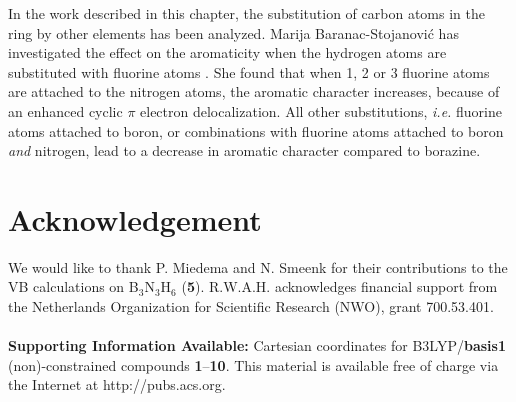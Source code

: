 In the work described in this chapter, the substitution of carbon atoms in the ring by other elements has been analyzed. Marija Baranac-Stojanovi\'c has investigated the effect on the aromaticity when the hydrogen atoms are substituted with fluorine atoms \cite{ac09}. She found that when 1, 2 or 3 fluorine atoms are attached to the nitrogen atoms, the aromatic character increases, because of an enhanced cyclic $\pi$ electron delocalization. All other substitutions, \textit{i.e.} fluorine atoms attached to boron, or combinations with fluorine atoms attached to boron \textit{and} nitrogen, lead to a decrease in aromatic character compared to borazine.

\section*{Acknowledgement}

We would like to thank P. Miedema and N. Smeenk for their contributions to the VB calculations on B$_3$N$_3$H$_6$ (\textbf{5}).
R.W.A.H. acknowledges financial support from the Netherlands Organization for Scientific Research (NWO), grant 700.53.401.
\\
\\
\noindent \textbf{Supporting Information Available:} Cartesian coordinates for B3LYP/\textbf{basis1} (non)-constrained
compounds \textbf{1}--\textbf{10}. This material is available free of charge via the Internet at
http://pubs.acs.org.



